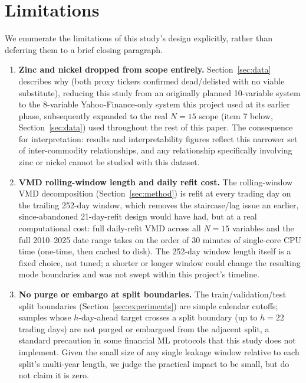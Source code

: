 \documentclass[journal]{IEEEtran}
\begin{document}
\FloatBarrier

\section{Limitations}
\label{sec:limitations}

We enumerate the limitations of this study's design explicitly, rather than deferring them to a brief closing paragraph.

\begin{enumerate}
    \item \textbf{Zinc and nickel dropped from scope entirely.} Section~\ref{sec:data} describes why (both proxy tickers confirmed dead/delisted with no viable substitute), reducing this study from an originally planned 10-variable system to the 8-variable Yahoo-Finance-only system this project used at its earlier phase, subsequently expanded to the real $N=15$ scope (item 7 below, Section~\ref{sec:data}) used throughout the rest of this paper. The consequence for interpretation: results and interpretability figures reflect this narrower set of inter-commodity relationships, and any relationship specifically involving zinc or nickel cannot be studied with this dataset.
    \item \textbf{VMD rolling-window length and daily refit cost.} The rolling-window VMD decomposition (Section~\ref{sec:method}) is refit at every trading day on the trailing 252-day window, which removes the staircase/lag issue an earlier, since-abandoned 21-day-refit design would have had, but at a real computational cost: full daily-refit VMD across all $N=15$ variables and the full 2010--2025 date range takes on the order of 30 minutes of single-core CPU time (one-time, then cached to disk). The 252-day window length itself is a fixed choice, not tuned; a shorter or longer window could change the resulting mode boundaries and was not swept within this project's timeline.
    \item \textbf{No purge or embargo at split boundaries.} The train/validation/test split boundaries (Section~\ref{sec:experiments}) are simple calendar cutoffs; samples whose $h$-day-ahead target crosses a split boundary (up to $h=22$ trading days) are not purged or embargoed from the adjacent split, a standard precaution in some financial ML protocols that this study does not implement. Given the small size of any single leakage window relative to each split's multi-year length, we judge the practical impact to be small, but do not claim it is zero.

\end{enumerate}
\end{document}
